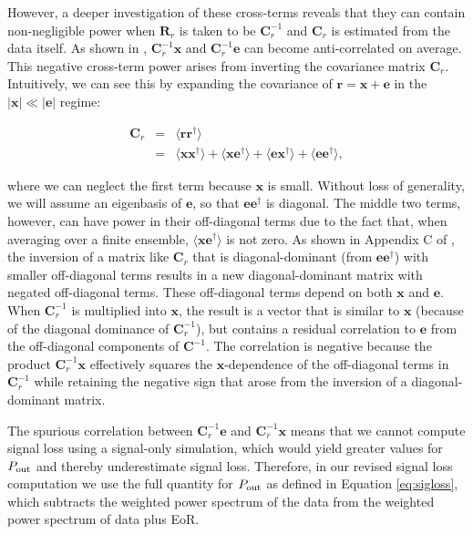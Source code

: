 \documentclass[preprint2,numberedappendix,tighten]{aastex6}  %
\begin{document}
However, a deeper investigation of these cross-terms reveals that they can contain non-negligible power when $\textbf{R}_{r}$
is taken to be $\textbf{C}_{r}^{-1}$ and
$\textbf{C}_{r}$ is estimated from the data itself.  As shown in \citet{switzer_et_al2015}, 
$\textbf{C}_{r}^{-1}\textbf{x}$ and
$\textbf{C}_{r}^{-1}\textbf{e}$
can become anti-correlated on average. 
This negative cross-term power arises from inverting the covariance matrix
$\textbf{C}_{r}$. 
Intuitively, we can see this by expanding the covariance of $\textbf{r}=\textbf{x}+\textbf{e}$ in the
$|\textbf{x}|\ll|\textbf{e}|$ regime:

\begin{eqnarray}
\textbf{C}_{r} &=& \langle \textbf{rr}^{\dagger} \rangle \\
&=& \langle \textbf{xx}^{\dagger} \rangle + \langle \textbf{xe}^{\dagger} \rangle + \langle \textbf{ex}^{\dagger} \rangle + \langle 
\textbf{ee}^{\dagger} \rangle,
\end{eqnarray}

\noindent where we can neglect the first term because $\textbf{x}$ is small.  Without loss of generality, we will assume
an eigenbasis of $\textbf{e}$, so that $\textbf{ee}^{\dagger}$ is diagonal.
The middle 
two terms, however, can have power in their off-diagonal terms due to the fact that, when averaging over a finite
ensemble, $\langle\textbf{xe}^\dagger\rangle$ is not zero.  As shown in Appendix C of \citet{parsons_et_al2014}, the
inversion of a matrix like $\textbf{C}_{r}$ that is diagonal-dominant (from $\textbf{ee}^{\dagger}$) with smaller
off-diagonal terms results in a new diagonal-dominant matrix with negated off-diagonal terms. These off-diagonal
terms depend on both $\textbf{x}$ and $\textbf{e}$. When $\textbf{C}^{-1}_{r}$ is multiplied into $\textbf{x}$,
the result is a vector that is similar to $\textbf{x}$ (because of the diagonal dominance of $\textbf{C}^{-1}_{r}$), but
contains a residual correlation to $\textbf{e}$ from the off-diagonal components of $\textbf{C}^{-1}$. The
correlation is negative because the product $\textbf{C}_r^{-1}\textbf{x}$ effectively squares the $\textbf{x}$-dependence
of the off-diagonal terms in $\textbf{C}^{-1}_{r}$ while retaining the negative sign that arose from the inversion
of a diagonal-dominant matrix.

The spurious correlation between $\textbf{C}_r^{-1}\textbf{e}$ and $\textbf{C}_r^{-1}\textbf{x}$ means that we cannot compute signal loss using a signal-only 
simulation, which would yield greater values for $P_{\rm out}$ and thereby underestimate signal loss. Therefore, in our revised 
signal loss computation we use the full quantity for $P_{\rm out}$ as defined in Equation \eqref{eq:sigloss}, which subtracts the 
weighted power spectrum of the data from the weighted power spectrum of data plus EoR. 
\end{document}
